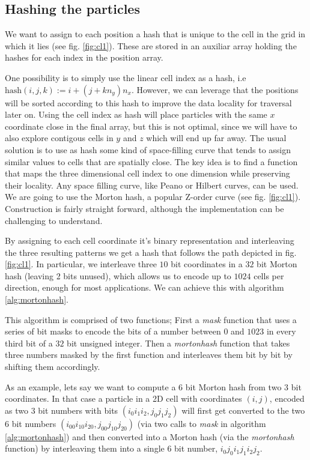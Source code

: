 \documentclass[ twoside,openright,titlepage,numbers=noenddot,%
headinclude,footinclude,cleardoublepage=empty,abstract=on,
BCOR=5mm,paper=a4,fontsize=11pt, dvipsnames
]{scrreprt}
\begin{document}
\subsection*{Hashing the particles}

We want to assign to each position a hash that is unique to the cell in the grid in which it lies (see fig. \ref{fig:cl1}).
These are stored in an auxiliar array holding the hashes for each index in the position array.

One possibility is to simply use the linear cell index as a hash, i.e $\textrm{hash}(i,j,k) := i + (j + kn_y)n_x$.
However, we can leverage that the positions will be sorted according to this hash to improve the data locality for traversal later on. Using the cell index as hash will place particles with the same $x$ coordinate close in the final array, but this is not optimal, since we will have to also explore contigous cells in $y$ and $z$ which will end up far away.
The usual solution is to use as hash some kind of space-filling curve that tends to assign similar values to cells that are spatially close. The key idea is to find a function that maps the three dimensional cell index to one dimension while preserving their locality. Any space filling curve, like Peano\cite{Peano1890} or Hilbert\cite{Hilbert1935} curves, can be used.
We are going to use the Morton hash\cite{Morton1966}, a popular Z-order curve (see fig. \ref{fig:cl1}). Construction is fairly straight forward, although the implementation can be challenging to understand.

By assigning to each cell coordinate it's binary representation and interleaving the three resulting patterns we get a hash that follows the path depicted in fig. \ref{fig:cl1}. In particular, we interleave three $10$ bit coordinates in a $32$ bit Morton hash (leaving 2 bits unused), which allows us to encode up to $1024$ cells per direction, enough for most applications. We can achieve this with algorithm \ref{alg:mortonhash}.

This algorithm is comprised of two functions; First a \emph{mask} function that uses a series of bit masks to encode the bits of a number between $0$ and $1023$ in every third bit of a $32$ bit unsigned integer. Then a \emph{mortonhash} function that takes three numbers masked by the first function and interleaves them bit by bit by shifting them accordingly.

As an example, lets say we want to compute a $6$ bit Morton hash from two $3$ bit coordinates. In that case a particle in a 2D cell with coordinates $(i,j)$, encoded as two $3$ bit numbers with bits $(i_0i_1i_2, j_0j_1j_2)$ will first get converted to the two $6$ bit numbers $(i_00i_10i_20, j_00j_10j_20)$ (via two calls to \emph{mask} in algorithm \ref{alg:mortonhash}) and then converted into a Morton hash (via the \emph{mortonhash} function) by interleaving them into a single $6$ bit number, $i_0j_0i_1j_1i_2j_2$.
\end{document}
